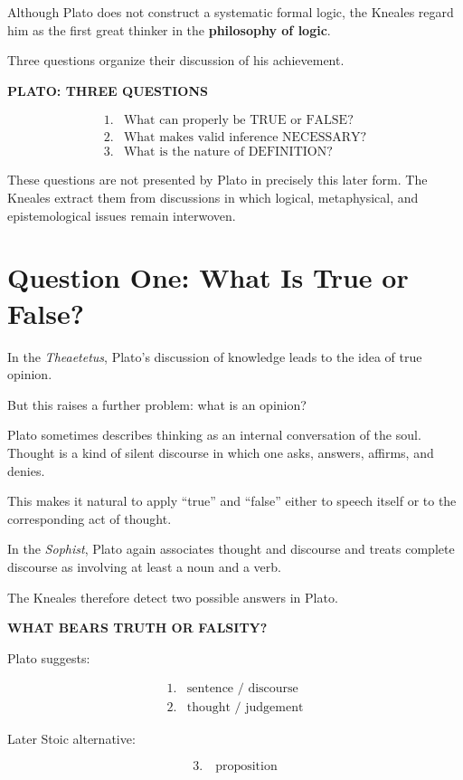 \documentclass[11pt]{article}
\begin{document}
Although Plato does not construct a systematic formal logic, the
Kneales regard him as the first great thinker in the
\textbf{philosophy of logic}.

Three questions organize their discussion of his achievement.

\begin{whiteboard}
\textbf{PLATO: THREE QUESTIONS}

\[
\begin{array}{ll}
1. & \text{What can properly be TRUE or FALSE?}\\[0.4em]
2. & \text{What makes valid inference NECESSARY?}\\[0.4em]
3. & \text{What is the nature of DEFINITION?}
\end{array}
\]
\end{whiteboard}

These questions are not presented by Plato in precisely this
later form. The Kneales extract them from discussions in which
logical, metaphysical, and epistemological issues remain
interwoven.

\section{Question One: What Is True or False?}

In the \textit{Theaetetus}, Plato's discussion of knowledge leads
to the idea of true opinion.

But this raises a further problem: what is an opinion?

Plato sometimes describes thinking as an internal conversation of
the soul. Thought is a kind of silent discourse in which one asks,
answers, affirms, and denies.

This makes it natural to apply ``true'' and ``false'' either to
speech itself or to the corresponding act of thought.

In the \textit{Sophist}, Plato again associates thought and
discourse and treats complete discourse as involving at least a
noun and a verb.

The Kneales therefore detect two possible answers in Plato.

\begin{whiteboard}
\textbf{WHAT BEARS TRUTH OR FALSITY?}

Plato suggests:

\[
\begin{array}{ll}
1. & \text{sentence / discourse}\\[0.3em]
2. & \text{thought / judgement}
\end{array}
\]

Later Stoic alternative:

\[
3.\quad \text{proposition}
\]
\end{whiteboard}
\end{document}
